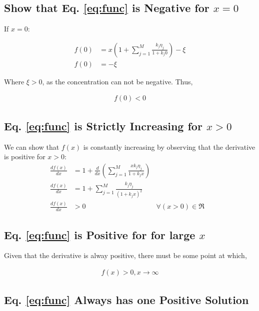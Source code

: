\documentclass[12pt]{article}
\begin{document}
  \subsection*{Show that Eq. \ref{eq:func} is Negative for $x=0$}

  If $x=0$:
  
  \begin{align}
    f(0) &= x\left(1+\sum_{j=1}^{M}\frac{k_j\eta_j}{1+k_j0}\right)-\xi\nonumber\\
    f(0) &=  - \xi    \nonumber
  \end{align}

  Where $\xi > 0$, as the concentration can not be negative. Thus,

  \begin{align}
    \label{eq:a}
    f(0) < 0
  \end{align}

  \subsection*{Eq. \ref{eq:func} is Strictly Increasing for $x>0$ }

  We can show that $f(x)$ is constantly increasing by observing that the
  derivative is positive for $x>0$:
  \begin{align}
    \frac{df(x)}{dx} &= 1+\frac{d}{dx}\left(\sum_{j=1}^{M}\frac{xk_j\eta_j}{1+k_jx}\right) &\nonumber\\
    \frac{df(x)}{dx} &= 1 + \sum_{j=1}^{M}\frac{k_j\eta_j}{(1+k_jx)^2} &\nonumber\\
    \label{eq:b}
    \frac{df(x)}{dx} &> 0 & \forall (x > 0)\in \Re &
  \end{align}

  \subsection*{Eq. \ref{eq:func} is Positive for for large $x$}
  
  Given that the derivative is alway positive, there must be some point at which,

  \begin{align}
    \label{eq:c}
    f(x) > 0, x \to \infty
  \end{align}

  \subsection*{Eq. \ref{eq:func} Always has one Positive Solution}
  
\end{document}
